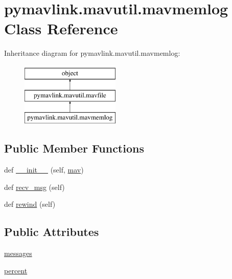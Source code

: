 \hypertarget{classpymavlink_1_1mavutil_1_1mavmemlog}{}\section{pymavlink.\+mavutil.\+mavmemlog Class Reference}
\label{classpymavlink_1_1mavutil_1_1mavmemlog}
Inheritance diagram for pymavlink.\+mavutil.\+mavmemlog\+:\begin{figure}[H]
\begin{center}
\leavevmode
\includegraphics[height=3.000000cm]{classpymavlink_1_1mavutil_1_1mavmemlog}
\end{center}
\end{figure}
\subsection*{Public Member Functions}
\begin{DoxyCompactItemize}
\item 
def \mbox{\hyperlink{classpymavlink_1_1mavutil_1_1mavmemlog_ad593163b44c0cb40074ed0b28553a5f9}{\+\_\+\+\_\+init\+\_\+\+\_\+}} (self, \mbox{\hyperlink{classpymavlink_1_1mavutil_1_1mavfile_aecb6ecfdc61f1c69fc0d15fcdef436b0}{mav}})
\item 
def \mbox{\hyperlink{classpymavlink_1_1mavutil_1_1mavmemlog_a7a84e52fc8bf9a84624c848c4a2229da}{recv\+\_\+msg}} (self)
\item 
def \mbox{\hyperlink{classpymavlink_1_1mavutil_1_1mavmemlog_ac3a0c1c0621a7b6ed341779bd313d493}{rewind}} (self)
\end{DoxyCompactItemize}
\subsection*{Public Attributes}
\begin{DoxyCompactItemize}
\item 
\mbox{\hyperlink{classpymavlink_1_1mavutil_1_1mavmemlog_a72353a723c995748c9d353e8b233f650}{messages}}
\item 
\mbox{\hyperlink{classpymavlink_1_1mavutil_1_1mavmemlog_a44ce7e3b3214bec1c9aaa2484cd7ebad}{percent}}
\end{DoxyCompactItemize}


